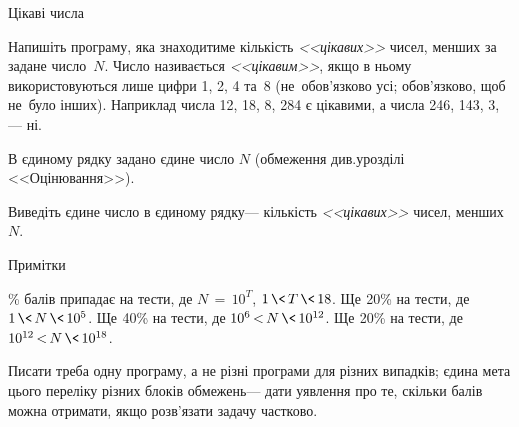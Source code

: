 {

\begin{problemAllDefault}{Цікаві числа}

Напишіть програму, яка знаходитиме кількість \emph{<<цікавих>>} чисел, менших за задане число~$N$. Число називається \emph{<<цікавим>>}, якщо в ньому використовуються лише цифри 1, 2, 4 та~8 (не~обов'язково усі; обов'язково, щоб не~було інших).
Наприклад числа 12, 18, 8, 284 є цікавими, а числа 246, 143, 3,\nolinebreak[3] --- ні.

\InputFile
В єдиному рядку задано єдине число $N$ (обмеження \ifAfour\else{}див.\nolinebreak[3]\fi у\nolinebreak[3] розділі <<Оцінювання>>).

\OutputFile
Виведіть єдине число в єдиному рядку\nolinebreak[3] --- кількість \emph{<<цікавих>>} чисел, менших~$N$.

\Example
\ifAfour
\hspace{-2em}
\else
\par\noindent
\fi
\begin{exampleSimpleThree}{5em}{5em}{24em}{Примітки}
\exmp{18}{7}{Цими сімома числами є: 
1,$\,\,$2,$\,\,$4,$\,\,$8,$\,\,$11,$\,\,$12,$\,\,$14.}%
\end{exampleSimpleThree}

\% балів припадає на тести, де ${N\,{=}\,10^T}$, ${1\,{\<}\,T\,{\<}\,18}$.
Ще\nolinebreak[3] ${\>}\,$20\% на тести, де ${1\,{\<}\,N\,{\<}\,10^{5}}$.
Ще\nolinebreak[3] ${\>}\,$40\% на тести, де ${10^{6}\,{<}\,N\,{\<}\,10^{12}}$.
Ще\nolinebreak[3] ${\>}\,$20\% на тести, де ${10^{12}\,{<}\,N\,{\<}\,10^{18}}$.
\ifAfour\else\par\fi
Писати треба одну програму, а не різні програми для різних випадків; єдина мета цього переліку різних блоків обмежень\nolinebreak[3] --- дати уявлення про те, скільки балів можна отримати, якщо розв’язати задачу частково.

\end{problemAllDefault}

}